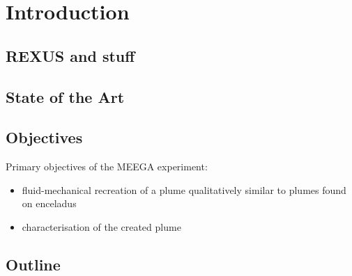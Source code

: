 \section{Introduction}
\subsection{REXUS and stuff}
\subsection{State of the Art}
\subsection{Objectives}
Primary objectives of the MEEGA experiment:
\begin{itemize}
    \item fluid-mechanical recreation of a plume qualitatively similar to 
    plumes found on enceladus 
    \item characterisation of the created plume
\end{itemize}
\subsection{Outline}



